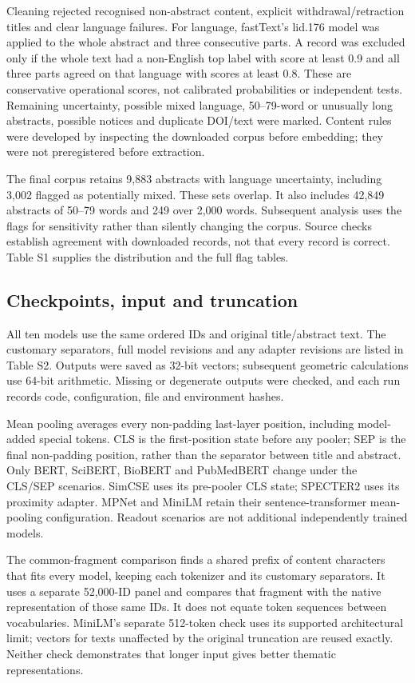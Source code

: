 \documentclass[12pt]{article}
\begin{document}
Cleaning rejected recognised non-abstract content, explicit withdrawal/retraction titles and clear language failures. For language, fastText's lid.176 model was applied to the whole abstract and three consecutive parts. A record was excluded only if the whole text had a non-English top label with score at least 0.9 and all three parts agreed on that language with scores at least 0.8. These are conservative operational scores, not calibrated probabilities or independent tests. Remaining uncertainty, possible mixed language, 50--79-word or unusually long abstracts, possible notices and duplicate DOI/text were marked. Content rules were developed by inspecting the downloaded corpus before embedding; they were not preregistered before extraction.

The final corpus retains 9,883 abstracts with language uncertainty, including 3,002 flagged as potentially mixed. These sets overlap. It also includes 42,849 abstracts of 50--79 words and 249 over 2,000 words. Subsequent analysis uses the flags for sensitivity rather than silently changing the corpus. Source checks establish agreement with downloaded records, not that every record is correct. Table S1 supplies the distribution and the full flag tables.
\clearpage

\FloatBarrier
\subsection{Checkpoints, input and truncation}
All ten models use the same ordered IDs and original title/abstract text. The customary separators, full model revisions and any adapter revisions are listed in Table S2. Outputs were saved as 32-bit vectors; subsequent geometric calculations use 64-bit arithmetic. Missing or degenerate outputs were checked, and each run records code, configuration, file and environment hashes.

Mean pooling averages every non-padding last-layer position, including model-added special tokens. CLS is the first-position state before any pooler; SEP is the final non-padding position, rather than the separator between title and abstract. Only BERT, SciBERT, BioBERT and PubMedBERT change under the CLS/SEP scenarios. SimCSE uses its pre-pooler CLS state; SPECTER2 uses its proximity adapter. MPNet and MiniLM retain their sentence-transformer mean-pooling configuration. Readout scenarios are not additional independently trained models.

The common-fragment comparison finds a shared prefix of content characters that fits every model, keeping each tokenizer and its customary separators. It uses a separate 52,000-ID panel and compares that fragment with the native representation of those same IDs. It does not equate token sequences between vocabularies. MiniLM's separate 512-token check uses its supported architectural limit; vectors for texts unaffected by the original truncation are reused exactly. Neither check demonstrates that longer input gives better thematic representations.
\clearpage

\FloatBarrier
\end{document}
